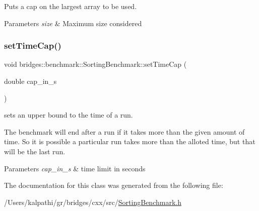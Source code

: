 Puts a cap on the largest array to be used. 


\begin{DoxyParams}{Parameters}
{\em size} & Maximum size considered \\
\hline
\end{DoxyParams}
\mbox{\label{classbridges_1_1benchmark_1_1_sorting_benchmark_a59b95f2510d62ac5a31bb33d472fdffc}} 
\subsubsection{\texorpdfstring{setTimeCap()}{setTimeCap()}}
{\footnotesize\ttfamily void bridges\+::benchmark\+::\+Sorting\+Benchmark\+::set\+Time\+Cap (\begin{DoxyParamCaption}\item[{double}]{cap\+\_\+in\+\_\+s }\end{DoxyParamCaption})\hspace{0.3cm}{\ttfamily [inline]}}



sets an upper bound to the time of a run. 

The benchmark will end after a run if it takes more than the given amount of time. So it is possible a particular run takes more than the alloted time, but that will be the last run.


\begin{DoxyParams}{Parameters}
{\em cap\+\_\+in\+\_\+s} & time limit in seconds \\
\hline
\end{DoxyParams}


The documentation for this class was generated from the following file\+:\begin{DoxyCompactItemize}
\item 
/\+Users/kalpathi/gr/bridges/cxx/src/\mbox{\hyperlink{_sorting_benchmark_8h}{Sorting\+Benchmark.\+h}}\end{DoxyCompactItemize}
